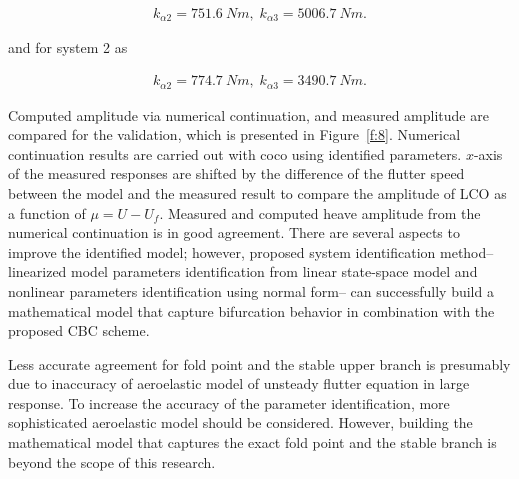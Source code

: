 \documentclass[openacc]{rsproca_new}%
\newcommand{\Fref}[1]{Figure~\ref{#1}}
\begin{document}
\begin{align}\label{eq:2-15}
k_{\alpha2}=751.6 \: Nm, \; k_{\alpha3}=5006.7 \: Nm.
\end{align}

\noindent and for system 2 as

\begin{align}\label{eq:2-15-2}
k_{\alpha2}=774.7 \: Nm, \; k_{\alpha3}=3490.7 \: Nm.
\end{align}

Computed amplitude via numerical continuation, and measured amplitude are compared for the validation, which is presented in \Fref{f:8}. Numerical continuation results are carried out with coco \cite{dankowicz2013recipes} using identified parameters. $x$-axis of the measured responses are shifted by the difference of the flutter speed between the model and the measured result to compare the amplitude of LCO as a function of $\mu=U-U_f$. Measured and computed heave amplitude from the numerical continuation is in good agreement. There are several aspects to improve the identified model; however, proposed system identification method-- linearized model parameters identification from linear state-space model and nonlinear parameters identification using normal form-- can successfully build a mathematical model that capture bifurcation behavior in combination with the proposed CBC scheme.

Less accurate agreement for fold point and the stable upper branch is presumably due to inaccuracy of aeroelastic model of unsteady flutter equation in large response. To increase the accuracy of the parameter identification, more sophisticated aeroelastic model should be considered. However, building the mathematical model that captures the exact fold point and the stable branch is beyond the scope of this research.
\end{document}
